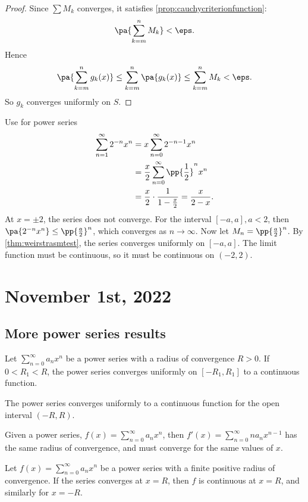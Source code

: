 \documentclass[11pt]{scrartcl}
\numberwithin{equation}{section}
\begin{document}
\begin{proof}
    Since $\sum M_k$ converges, it satisfies \cref{prop:cauchycriterionfunction}:
    \[
        \pa{\sum_{k=m}^{n}M_k}<\eps.
    \]
    Hence 
    \[
        \pa{\sum_{k=m}^{n}g_k(x)}\leq \sum_{k=m}^{n}\pa{g_k(x)}\leq 
        \sum_{k=m}^{n}M_k<\eps.
    \]
    So $g_k$ converges uniformly on $S$.
\end{proof}

\begin{example}
    Use for power series 
    \begin{align*}
        \sum_{n=1}^{\infty}2^{-n}x^n &= x\sum_{n=0}^{\infty}2^{-n-1}x^n \\
        &= \frac{x}{2}\sum_{n=0}^{\infty}\pp{\frac{1}{2}}^nx^n \\
        &= \frac{x}{2}\cdot\frac{1}{1-\frac{x}{2}}=\frac{x}{2-x}.
    \end{align*}
    At $x=\pm2$, the series does not converge. For the interval
    $[-a,a], a<2$, then $\pa{2^{-n}x^n}\leq \pp{\frac{a}{2}}^n$,
    which converges as $n\to \infty$. Now let $M_n=\pp{\frac{a}{2}}^n$. By 
    \cref{thm:weirstrasmtest}, the series converges uniformly on 
    $[-a,a]$. The limit function must be continuous, so it 
    must be continuous on $(-2,2)$.
\end{example}

\clearpage
\section{November 1st, 2022}
\subsection{More power series results}
\begin{theorem}
    Let $\sum_{n=0}^{\infty}a_nx^n$ be a power series with 
    a radius of convergence $R>0$. If $0<R_1<R$, the power series 
    converges uniformly on $[-R_1,R_1]$ to a continuous function.
\end{theorem}

\begin{corollary}
    The power series converges uniformly to a continuous function for the 
    open interval $(-R,R)$.
\end{corollary}
Given a power series, $f(x) = \sum_{n=0}^{\infty}a_nx^n$, then 
$f'(x) = \sum_{n=0}^{\infty}na_nx^{n-1}$ has the same radius 
of convergence, and must converge for the same values of $x$.

\begin{theorem}
    \label{thm:abelthm}
    Let $f(x)=\sum_{n=0}^{\infty}a_nx^n$ be a power series with a 
    finite positive radius of convergence. If the series 
    converges at $x=R$, then $f$ is continuous at $x=R$,
    and similarly for $x=-R$.
\end{theorem}
\end{document}
